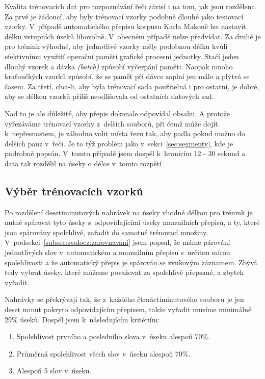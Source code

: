 Kvalita trénovacích dat pro rozpoznávání řeči závisí i na tom, jak jsou
rozdělena. Za prvé je žádoucí, aby byly trénovací vzorky podobně dlouhé
jako testovací vzorky\cite{nagorski2003search}.
V~případě automatického přepisu korpusu Karla Makoně lze
nastavit délku vstupních úseků libovolně. V~obecném případě nelze předvídat.
Za druhé je pro trénink výhodné, aby jednotlivé vzorky měly podobnou délku kvůli
efektivnímu využití operační paměti grafické procesní jednotky. Stačí jeden
dlouhý vzorek a dávka {\em (batch)} způsobí vyčerpání paměti. Naopak mnoho
kraťoučkých vzorků způsobí, že se paměť při dávce zaplní jen málo a plýtvá se
časem. Za třetí, chci-li, aby byla trénovací sada použitelná i pro ostatní,
je dobré, aby se délkou vzorků příliš neodlišovala od ostatních datových sad.

Nad to je ale důležité, aby přepis dokonale odpovídal obsahu. A protože
vyřezáváme trénovací vzorky z~delších souborů, při čemž může dojít
k~nepřesnostem, je záhodno volit místa řezu tak, aby padla pokud možno do
delších pauz v~řeči. Je to týž problém jako v~sekci~\ref{sec:segmenty}, kde je
podrobně popsán. V~tomto
případě jsem dospěl k~hranicím 12 - 30 sekund a data tak rozdělil na úseky o
délce v~tomto rozpětí.

\subsection{Výběr trénovacích vzorků}

Po rozdělení desetiminutových nahrávek na úseky vhodné délkou pro trénink je
nutné spárovat tyto úseky s~odpovídajícími úseky manuálních přepisů, a ty, které
jsou spárovány spolehlivě, zařadit do samotné trénovací množiny.
V~podsekci~\ref{subsec:svolocz:zarovnavani} jsem popsal, že máme párování
jednotlivých slov v~automatickém a manuálním přepisu s~určitou mírou
spolehlivosti a že automatický přepis je spárován se zvukovým záznamem. Zbývá
tedy vybrat úseky, které můžeme považovat za spolehlivě přepsané, a zbytek
vyřadit.

Nahrávky se překrývají tak, že z~každého čtrnáctiminutového souboru je jen deset
minut pokryto odpovídajícím přepisem, takže vyřadit musíme minimálně 29\% úseků.
Dospěl jsem k~následujícím kritériím:

\begin{enumerate}
\item{Spolehlivost prvního a posledního slova v~úseku alespoň 70\%.}
\item{Průměrná spolehlivost všech slov v~úseku alespoň 70\%.}
\item{Alespoň 5 slov v~úseku.}
\end{enumerate}

